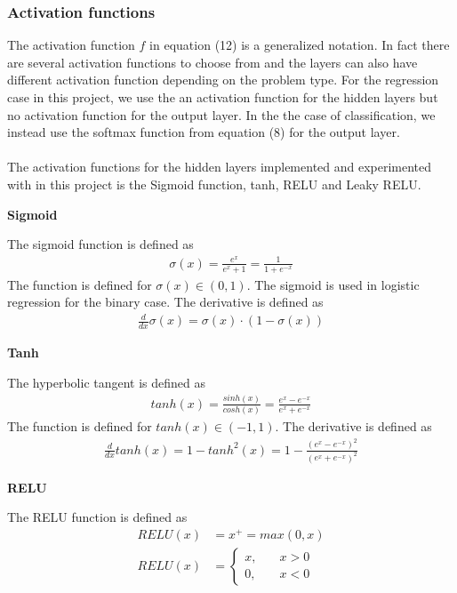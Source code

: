 \documentclass[a4paper,twocolumn]{article}
\begin{document}
\subsubsection{Activation functions}
The activation function $f$ in equation (12) is a generalized notation. In fact there are several activation functions to choose from and the layers can also have different activation function depending on the problem type. For the regression case in this project, we use the an activation function for the hidden layers but no activation function for the output layer. In the the case of classification, we instead use the softmax function from equation (8) for the output layer.\\
\\
The activation functions for the hidden layers implemented and experimented with in this project is the Sigmoid function, tanh, RELU and Leaky RELU.
\begin{center}
    \textbf{Sigmoid}
\end{center}
The sigmoid function is defined as
\begin{align}
    \sigma(x) = \frac{e^{x}}{e^{x} + 1} = \frac{1}{1 + e^{-x}}
\end{align}
The function is defined for $\sigma(x) \in (0,1)$. The sigmoid is used in logistic regression for the binary case. The derivative is defined as
\begin{align}
    \frac{d}{dx}\sigma(x) = \sigma(x) \cdot (1 - \sigma(x))
\end{align}
\begin{center}
    \textbf{Tanh}
\end{center}
The hyperbolic tangent is defined as 
\begin{align}
    tanh(x) = \frac{sinh(x)}{cosh(x)} = \frac{e^{x} - e^{-x}}{e^{x} + e^{-x}}
\end{align}
The function is defined for $tanh(x) \in (-1, 1)$. The derivative is defined as
\begin{align}
    \frac{d}{dx}tanh(x) = 1 - tanh^{2}(x) = 1 - \frac{(e^{x} - e^{-x})^{2}}{(e^{x} + e^{-x})^{2}}
\end{align}
\begin{center}
    \textbf{RELU}
\end{center}
The RELU function is defined as 
\begin{align}
    RELU(x) &= x^{+} = max (0, x)\\
    RELU(x) &= \begin{cases} 
                    x, &\quad x > 0\\
                    0, &\quad x < 0
                \end{cases}
\end{align}
\end{document}
